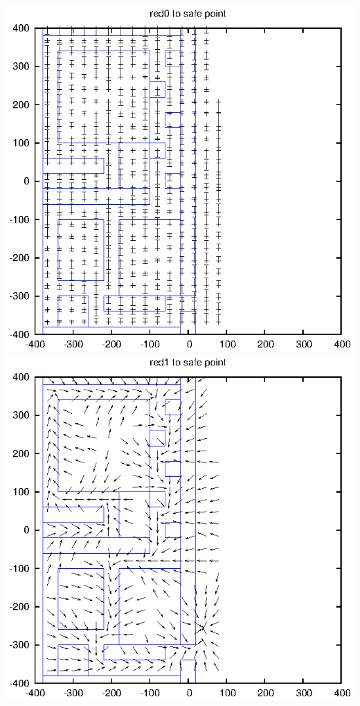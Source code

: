 \documentclass{article}
\begin{document}
\includegraphics[width=\textwidth]{graphics/red0_safePoint}
\includegraphics[width=\textwidth]{graphics/red1_safePoint}
\end{document}
